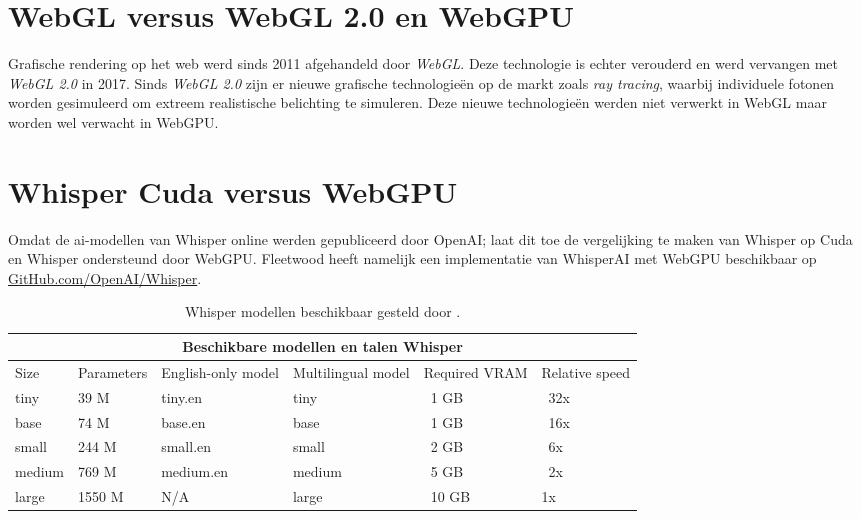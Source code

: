 \section{WebGL versus WebGL 2.0 en WebGPU}

Grafische rendering op het web werd sinds 2011 afgehandeld door \textit{WebGL}. Deze technologie is echter verouderd en werd vervangen met \textit{WebGL 2.0} in 2017. Sinds \textit{WebGL 2.0} zijn er nieuwe grafische technologieën op de markt zoals \textit{ray tracing}, waarbij individuele fotonen worden gesimuleerd om extreem realistische belichting te simuleren. Deze nieuwe technologieën werden niet verwerkt in WebGL maar worden wel verwacht in WebGPU.

\break{}

\section{Whisper Cuda versus WebGPU}

Omdat de ai-modellen van Whisper online werden gepubliceerd door OpenAI; laat dit toe de vergelijking te maken van Whisper op Cuda en Whisper ondersteund door WebGPU. Fleetwood heeft namelijk een implementatie van WhisperAI met WebGPU beschikbaar op \href{https://github.com/openai/whisper}{GitHub.com/OpenAI/Whisper}.

\bigbreak{}
\begin{table}
    \begin{tabular}{ |p{1.5cm}|p{2.5cm}|p{3cm}|p{3cm}|p{2cm}|p{2cm}|  }
        \hline
        \multicolumn{6}{|c|}{Beschikbare modellen en talen Whisper} \\
        \hline
            Size& Parameters & English-only model & Multilingual model & Required VRAM & Relative speed\\
        \hline
            tiny&       39 M    &tiny.en    & tiny& ~1 GB& ~32x     \\
            base &      74 M	&base.en    & base & ~1 GB & ~16x   \\
            small &     244 M	&small.en   & small & ~2 GB & ~6x   \\
            medium &    769 M	&medium.en  & medium & ~5 GB & ~2x  \\
            large &     1550 M	&N/A        & large & ~10 GB& 	1x  \\
        \hline
    \end{tabular}
    \caption{Whisper modellen beschikbaar gesteld door \textcite{OpenAI2023}.}
    \label{tab:OpenAIWhisperModels}
\end{table}


